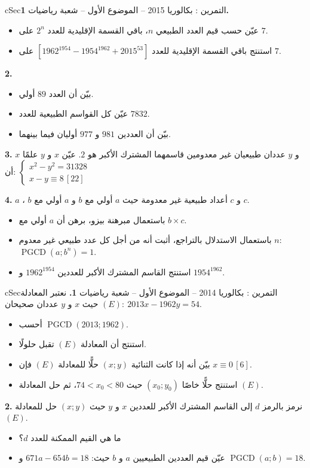 \documentclass[12pt,a4paper]{article}
\newenvironment{BOX}[2]{\begin{otherlanguage}{english}\begin{arbox}{#1}{#2}}{\end{arbox}\end{otherlanguage}}
\newcounter{exo}
\newenvironment{tamrin}[1]{\stepcounter{exo}\begin{BOX}{cSec}{التمرين \theexo: #1}}{\end{BOX}}
\newcommand{\pgcd}{\operatorname{PGCD}}
\newenvironment{sq}{\begin{itemize}[leftmargin=2.4em,itemsep=3pt]}{\end{itemize}}
\newcommand{\qa}{\item[(أ)]}\newcommand{\qb}{\item[(ب)]}\newcommand{\qc}{\item[(جـ)]}\newcommand{\qd}{\item[(د)]}\newcommand{\qe}{\item[(هـ)]}
\begin{document}
\begin{tamrin}{بكالوريا 2015 -- الموضوع الأول -- شعبة رياضيات}
\textbf{1.}
\begin{sq}
\qa عيّن حسب قيم العدد الطبيعي $n$، باقي القسمة الإقليدية للعدد $2^n$ على $7$.
\qb استنتج باقي القسمة الإقليدية للعدد $\left[1962^{1954}-1954^{1962}+2015^{53}\right]$ على $7$.
\end{sq}
\textbf{2.}
\begin{sq}
\qa بيّن أن العدد $89$ أولي.
\qb عيّن كل القواسم الطبيعية للعدد $7832$.
\qc بيّن أن العددين $981$ و $977$ أوليان فيما بينهما.
\end{sq}
\textbf{3.} $x$ و $y$ عددان طبيعيان غير معدومين قاسمهما المشترك الأكبر هو $2$.
عيّن $x$ و $y$ علمًا أن: $\begin{cases}x^2-y^2=31328\\ x-y\equiv8\,[22]\end{cases}$

\textbf{4.} $a$ ، $b$ و $c$ أعداد طبيعية غير معدومة حيث $a$ أولي مع $b$ و $a$ أولي مع $c$.
\begin{sq}
\qa باستعمال مبرهنة بيزو، برهن أن $a$ أولي مع $b\times c$.
\qb باستعمال الاستدلال بالتراجع، أثبت أنه من أجل كل عدد طبيعي غير معدوم $n$: $\pgcd\left(a;b^n\right)=1$.
\qc استنتج القاسم المشترك الأكبر للعددين $1962^{1954}$ و $1954^{1962}$.
\end{sq}
\end{tamrin}

\begin{tamrin}{بكالوريا 2014 -- الموضوع الأول -- شعبة رياضيات}
\textbf{1.} نعتبر المعادلة $(E):\ 2013x-1962y=54$ حيث $x$ و $y$ عددان صحيحان.
\begin{sq}
\qa أحسب $\pgcd(2013;1962)$.
\qb استنتج أن المعادلة $(E)$ تقبل حلولًا.
\qc بيّن أنه إذا كانت الثنائية $(x;y)$ حلًّا للمعادلة $(E)$ فإن $x\equiv0\,[6]$.
\qd استنتج حلًّا خاصًا $(x_0;y_0)$ حيث $74<x_0<80$، ثم حل المعادلة $(E)$.
\end{sq}
\textbf{2.} نرمز بالرمز $d$ إلى القاسم المشترك الأكبر للعددين $x$ و $y$ حيث $(x;y)$ حل للمعادلة $(E)$.
\begin{sq}
\qa ما هي القيم الممكنة للعدد $d$؟
\qb عيّن قيم العددين الطبيعيين $a$ و $b$ حيث: $671a-654b=18$ و $\pgcd(a;b)=18$.
\end{sq}
\end{tamrin}
\end{document}
